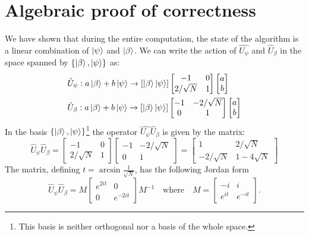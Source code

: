 \section{Algebraic proof of correctness}
We have shown that during the entire computation, the state of the algorithm is a linear combination of $\ket{\psi}$ and $\ket{\beta}$. We can write the action of $\hat{U_\psi}$ and $\hat{U}_\beta$ in the space spanned by $\{\ket{\beta}, \ket{\psi}\}$ as:
\begin{align*}
    &\hat{U}_\psi : a\ket{\beta} + b\ket{\psi} \rightarrow [\ket{\beta}\ket{\psi}] \begin{bmatrix}
    -1 & 0 \\
    2/\sqrt{N} & 1
    \end{bmatrix} 
    \begin{bmatrix}
    a \\
    b
    \end{bmatrix} \\
    &\hat{U}_\beta : a\ket{\beta} + b\ket{\psi} \rightarrow [\ket{\beta}\ket{\psi}] \begin{bmatrix}
    -1 & -2/\sqrt{N} \\
    0 & 1
    \end{bmatrix} 
    \begin{bmatrix}
    a \\
    b
    \end{bmatrix} 
\end{align*}
In the basis $\{\ket{\beta}, \ket{\psi}\}$\footnote{This basis is neither orthogonal nor a basis of the whole space.} the operator $\hat{U_\psi}\hat{U}_\beta$ is given by the matrix:
\begin{equation*}
    \hat{U}_\psi\hat{U}_\beta = \begin{bmatrix}
    -1 & 0 \\
    2/\sqrt{N} & 1
    \end{bmatrix} 
    \begin{bmatrix}
    -1 & -2/\sqrt{N} \\
    0 & 1
    \end{bmatrix}  =
    \begin{bmatrix}
    1 & 2/\sqrt{N} \\
    -2/\sqrt{N} & 1-4\sqrt{N}
    \end{bmatrix} 
\end{equation*}
The matrix, defining $t=\arcsin{\frac{1}{\sqrt{N}}}$, has the following Jordan form
\begin{equation*}
    \hat{U}_\psi\hat{U}_\beta = M  \begin{bmatrix}
    e^{2it} & 0 \\
    0 & e^{-2it}
    \end{bmatrix}  M^{-1} \quad \text{where} \quad M = \begin{bmatrix}
    -i & i \\
    e^{it} & e^{-it}
    \end{bmatrix}.
  \end{equation*}

